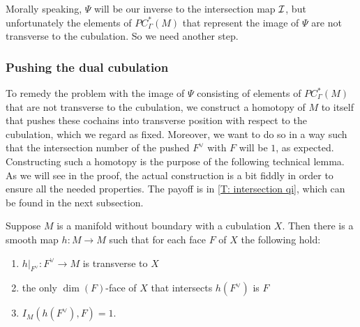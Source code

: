 Morally speaking, $\Psi$ will be our inverse to the intersection map $\mathcal{I}$, but unfortunately the elements of $PC^*_\Gamma(M)$ that represent the image of $\Psi$ are not transverse to the cubulation.
So we need another step.

\subsubsection{Pushing the dual cubulation}

To remedy the problem with the image of $\Psi$ consisting of elements of $PC^*_\Gamma(M)$ that are not transverse to the cubulation, we construct a homotopy of $M$ to itself that pushes these cochains into transverse position with respect to the cubulation, which we regard as fixed.
Moreover, we want to do so in a way such that the intersection number of the pushed $F^\vee$ with $F$ will be $1$, as expected.
Constructing such a homotopy is the purpose of the following technical lemma.
As we will see in the proof, the actual construction is a bit fiddly in order to ensure all the needed properties.
The payoff is in \cref{T: intersection qi}, which can be found in the next subsection.

\begin{lemma}
	Suppose $M$ is a manifold without boundary with a cubulation $X$.
	Then there is a smooth map $h \colon M \to M$ such that for each face $F$ of $X$ the following hold:
	\begin{enumerate}
		\item $h|_{F^\vee} \colon F^\vee \to M$ is transverse to $X$
		\item the only $\dim(F)$-face of $X$ that intersects $h(F^\vee)$ is $F$
		\item $I_M(h(F^\vee),F) = 1$.
	\end{enumerate}
\end{lemma}


